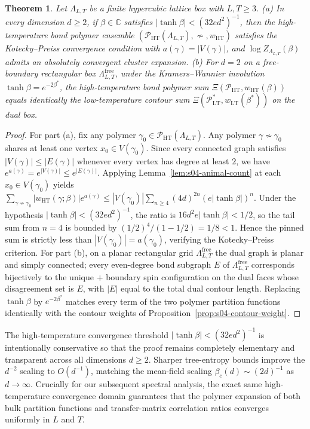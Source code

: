 \documentclass[11pt]{article}
\newtheorem{theorem}{Theorem}[section]
\theoremstyle{definition}
\begin{document}
\begin{theorem}
\label{thm:s04-duality}
Let $\Lambda_{L,T}$ be a finite hypercubic lattice box with $L, T \ge 3$. (a) In
every dimension $d \ge 2$, if $\beta \in \mathbb{C}$ satisfies $|\tanh \beta| < (32
e d^2)^{-1}$, then the high-temperature bond polymer ensemble
$(\mathcal{P}_{\mathrm{HT}}(\Lambda_{L,T}), \not\sim, w_{\mathrm{HT}})$ satisfies
the Kotecky--Preiss convergence condition with $a(\gamma) = |V(\gamma)|$, and $\log
Z_{\Lambda_{L,T}}(\beta)$ admits an absolutely convergent cluster expansion. (b) For
$d = 2$ on a free-boundary rectangular box $\Lambda_{L,T}^{\mathrm{free}}$, under
the Kramers--Wannier involution $\tanh \beta = e^{-2\beta^*}$, the high-temperature
bond polymer sum $\Xi(\mathcal{P}_{\mathrm{HT}}, w_{\mathrm{HT}}(\beta))$ equals
identically the low-temperature contour sum $\Xi(\mathcal{P}_{\mathrm{LT}}^*,
w_{\mathrm{LT}}(\beta^*))$ on the dual box.
\end{theorem}
\begin{proof}
For part (a), fix any polymer $\gamma_0 \in
\mathcal{P}_{\mathrm{HT}}(\Lambda_{L,T})$. Any polymer $\gamma \not\sim \gamma_0$
shares at least one vertex $x_0 \in V(\gamma_0)$. Since every connected graph
satisfies $|V(\gamma)| \le |E(\gamma)|$ whenever every vertex has degree at least
$2$, we have $e^{a(\gamma)} = e^{|V(\gamma)|} \le e^{|E(\gamma)|}$. Applying
Lemma~\ref{lem:s04-animal-count} at each $x_0 \in V(\gamma_0)$ yields $\sum_{\gamma
\not\sim \gamma_0} |w_{\mathrm{HT}}(\gamma; \beta)| e^{a(\gamma)} \le |V(\gamma_0)|
\sum_{n \ge 4} (4d)^{2n} (e |\tanh \beta|)^n$. Under the hypothesis $|\tanh \beta| <
(32 e d^2)^{-1}$, the ratio is $16 d^2 e |\tanh \beta| < 1/2$, so the tail sum from
$n = 4$ is bounded by $(1/2)^4 / (1 - 1/2) = 1/8 < 1$. Hence the pinned sum is
strictly less than $|V(\gamma_0)| = a(\gamma_0)$, verifying the Kotecky--Preiss
criterion. For part (b), on a planar rectangular grid
$\Lambda_{L,T}^{\mathrm{free}}$ the dual graph is planar and simply connected; every
even-degree bond subgraph $E$ of $\Lambda_{L,T}^{\mathrm{free}}$ corresponds
bijectively to the unique $+$ boundary spin configuration on the dual faces whose
disagreement set is $E$, with $|E|$ equal to the total dual contour length.
Replacing $\tanh \beta$ by $e^{-2\beta^*}$ matches every term of the two polymer
partition functions identically with the contour weights of
Proposition~\ref{prop:s04-contour-weight}.
\end{proof}

The high-temperature convergence threshold $|\tanh \beta| < (32 e d^2)^{-1}$ is
intentionally conservative so that the proof remains completely elementary and
transparent across all dimensions $d \ge 2$. Sharper tree-entropy bounds improve the
$d^{-2}$ scaling to $O(d^{-1})$, matching the mean-field scaling $\beta_c(d) \sim
(2d)^{-1}$ as $d \to \infty$. Crucially for our subsequent spectral analysis, the
exact same high-temperature convergence domain guarantees that the polymer expansion
of both bulk partition functions and transfer-matrix correlation ratios converges
uniformly in $L$ and $T$.
\end{document}
